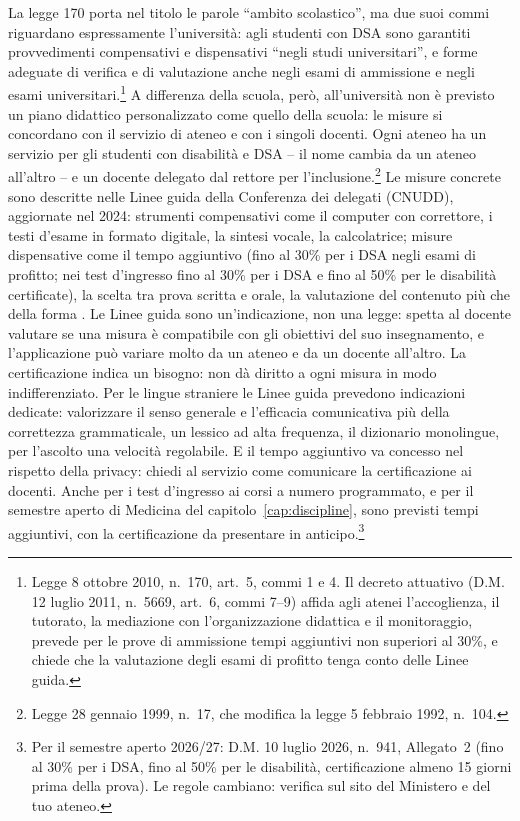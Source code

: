 La legge 170 porta nel titolo le parole \enquote{ambito scolastico},
ma due suoi commi riguardano espressamente l'università: agli studenti
con DSA sono garantiti provvedimenti compensativi e dispensativi
\enquote{negli studi universitari}, e forme adeguate di verifica e di
valutazione anche negli esami di ammissione e negli esami
universitari.\footnote{Legge 8 ottobre 2010, n.~170, art.~5, commi 1 e
4. Il decreto attuativo (D.M. 12 luglio 2011, n.~5669, art.~6, commi
7--9) affida agli atenei l'accoglienza, il tutorato, la mediazione con
l'organizzazione didattica e il monitoraggio, prevede per le prove di
ammissione tempi aggiuntivi non superiori al 30\%, e chiede che la
valutazione degli esami di profitto tenga conto delle Linee guida.}
A differenza della scuola, però, all'università non è previsto un piano didattico personalizzato come quello della scuola: le misure si concordano con il
servizio di ateneo e con i singoli docenti. Ogni ateneo ha un servizio
per gli studenti con disabilità e DSA -- il nome cambia da un ateneo
all'altro -- e un docente delegato dal rettore per
l'inclusione.\footnote{Legge 28 gennaio 1999, n.~17, che modifica la
legge 5 febbraio 1992, n.~104.} Le misure concrete sono descritte nelle
Linee guida della Conferenza dei delegati (CNUDD), aggiornate nel 2024:
strumenti compensativi come il computer con correttore, i testi
d'esame in formato digitale, la sintesi vocale, la calcolatrice;
misure dispensative come il tempo aggiuntivo (fino al 30\% per i DSA
negli esami di profitto; nei test d'ingresso fino al 30\% per i DSA e
fino al 50\% per le disabilità certificate), la scelta tra
prova scritta e orale, la valutazione del contenuto più che della
forma \parencite{cnudd2024}. Le Linee guida sono un'indicazione, non
una legge: spetta al docente valutare se una misura è compatibile con
gli obiettivi del suo insegnamento, e l'applicazione può variare molto da un ateneo e da un docente all'altro. La certificazione indica un bisogno: non dà diritto a ogni misura in modo indifferenziato. Per le lingue straniere le Linee guida prevedono indicazioni dedicate: valorizzare il senso generale e l'efficacia comunicativa più della correttezza grammaticale, un lessico ad alta frequenza, il dizionario monolingue, per l'ascolto una velocità regolabile. E il tempo aggiuntivo va concesso nel rispetto della privacy: chiedi al servizio come comunicare la certificazione ai docenti. Anche per i test d'ingresso ai corsi a numero programmato, e
per il semestre aperto di Medicina del capitolo~\ref{cap:discipline},
sono previsti tempi aggiuntivi, con la certificazione da presentare
in anticipo.\footnote{Per il semestre aperto 2026/27: D.M. 10 luglio
2026, n.~941, Allegato~2 (fino al 30\% per i DSA, fino al 50\% per le
disabilità, certificazione almeno 15 giorni prima della prova). Le
regole cambiano: verifica sul sito del Ministero e del tuo ateneo.}

